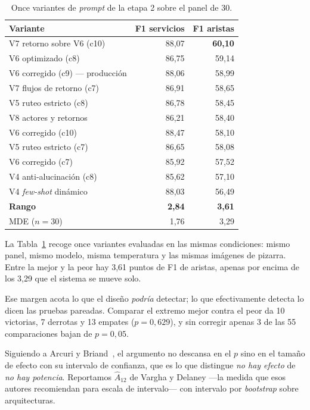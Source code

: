 \documentclass[a4paper, twocolumn, 10pt]{IEEEtran}
\begin{document}
\begin{table}[H]
\centering\small
\caption{Once variantes de \emph{prompt} de la etapa 2 sobre el panel de 30.}
\label{tab:variantes}
\begin{tabular}{lrr}
\toprule
Variante & F1 servicios & F1 aristas\\
\midrule
V7 retorno sobre V6 (c10)          & 88,07 & \textbf{60,10}\\
V6 optimizado (c8)                 & 86,75 & 59,14\\
V6 corregido (c9) --- producción   & 88,06 & 58,99\\
V7 flujos de retorno (c7)          & 86,91 & 58,65\\
V5 ruteo estricto (c8)             & 86,78 & 58,45\\
V8 actores y retornos              & 86,21 & 58,40\\
V6 corregido (c10)                 & 88,47 & 58,10\\
V5 ruteo estricto (c7)             & 86,65 & 58,08\\
V6 corregido (c7)                  & 85,92 & 57,52\\
V4 anti-alucinación (c8)           & 85,62 & 57,10\\
V4 \emph{few-shot} dinámico        & 88,03 & 56,49\\
\midrule
\textbf{Rango}                     & \textbf{2,84} & \textbf{3,61}\\
MDE ($n=30$)                       & 1,76 & 3,29\\
\bottomrule
\end{tabular}
\end{table}

La Tabla~\ref{tab:variantes} recoge once variantes evaluadas en las
mismas condiciones: mismo panel, mismo modelo, misma temperatura y las
mismas imágenes de pizarra. Entre la mejor y la peor hay 3,61 puntos de
F1 de aristas, apenas por encima de los 3,29 que el sistema se mueve
solo.

Ese margen acota lo que el diseño \emph{podría} detectar; lo que
efectivamente detecta lo dicen las pruebas pareadas. Comparar el extremo
mejor contra el peor da 10 victorias, 7 derrotas y 13 empates
($p=0{,}629$), y sin corregir apenas 3 de las 55 comparaciones bajan de
$p=0{,}05$.

Siguiendo a Arcuri y Briand~\cite{Arcuri2011StatisticalSE}, el argumento
no descansa en el $p$ sino en el tamaño de efecto con su intervalo de
confianza, que es lo que distingue \emph{no hay efecto} de \emph{no hay
potencia}. Reportamos $\hat{A}_{12}$ de Vargha y Delaney ---la medida que
esos autores recomiendan para escala de intervalo--- con intervalo por
\emph{bootstrap} sobre arquitecturas.
\end{document}
